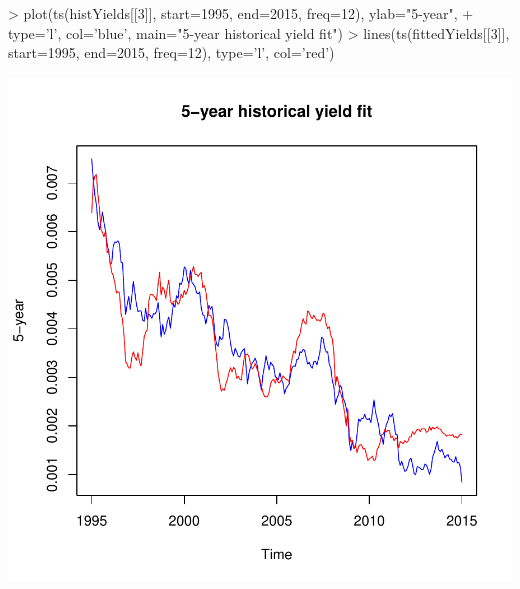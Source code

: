 \documentclass[12pt]{article}
\begin{document}
\begin{Schunk}
\begin{Sinput}
> plot(ts(histYields[[3]], start=1995, end=2015, freq=12), ylab="5-year", 
+   type='l', col='blue', main="5-year historical yield fit")
> lines(ts(fittedYields[[3]], start=1995, end=2015, freq=12), type='l', col='red')
\end{Sinput}
\end{Schunk}
\includegraphics{pricing_kernel_demo-007}
\end{document}
